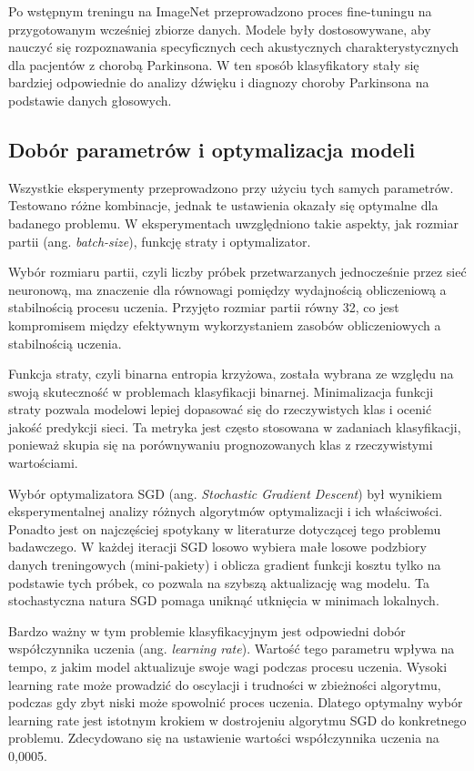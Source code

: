 Po wstępnym treningu na ImageNet przeprowadzono proces fine-tuningu na przygotowanym wcześniej zbiorze danych.
Modele były dostosowywane, aby nauczyć się rozpoznawania specyficznych cech akustycznych charakterystycznych dla pacjentów z chorobą Parkinsona.
W ten sposób klasyfikatory stały się bardziej odpowiednie do analizy dźwięku i diagnozy choroby Parkinsona na podstawie danych głosowych.

\subsection{Dobór parametrów i optymalizacja modeli}
\label{subsec:optymalizacja-modeli}

Wszystkie eksperymenty przeprowadzono przy użyciu tych samych parametrów.
Testowano różne kombinacje, jednak te ustawienia okazały się optymalne dla badanego problemu.
W eksperymentach uwzględniono takie aspekty, jak rozmiar partii (ang. \emph{batch-size}), funkcję  straty i optymalizator.

Wybór rozmiaru partii, czyli liczby próbek przetwarzanych jednocześnie przez sieć neuronową, ma znaczenie dla równowagi pomiędzy wydajnością obliczeniową a stabilnością procesu  uczenia.
Przyjęto rozmiar partii równy 32, co jest kompromisem między efektywnym wykorzystaniem zasobów obliczeniowych a stabilnością uczenia.

Funkcja straty, czyli binarna entropia krzyżowa, została wybrana ze względu na swoją skuteczność w problemach klasyfikacji binarnej.
Minimalizacja funkcji straty pozwala modelowi lepiej dopasować się do rzeczywistych klas i ocenić jakość predykcji sieci.
Ta metryka jest często stosowana w zadaniach klasyfikacji, ponieważ skupia się na porównywaniu prognozowanych klas z rzeczywistymi wartościami.

Wybór optymalizatora SGD (ang. \emph{Stochastic Gradient Descent}) był wynikiem eksperymentalnej analizy różnych algorytmów optymalizacji i ich właściwości.
Ponadto jest on najczęściej spotykany w literaturze dotyczącej tego problemu badawczego.
W każdej iteracji SGD losowo wybiera małe losowe podzbiory danych treningowych (mini-pakiety) i oblicza gradient funkcji kosztu tylko na podstawie tych próbek, co pozwala na szybszą aktualizację wag modelu.
Ta stochastyczna natura SGD pomaga uniknąć utknięcia w minimach lokalnych.

Bardzo ważny w tym problemie klasyfikacyjnym jest odpowiedni dobór współczynnika uczenia (ang. \emph{learning rate}).
Wartość tego parametru wpływa na tempo, z jakim model aktualizuje swoje wagi podczas procesu uczenia.
Wysoki learning rate może prowadzić do oscylacji i trudności w zbieżności algorytmu, podczas gdy zbyt niski może spowolnić proces uczenia.
Dlatego optymalny wybór learning rate jest istotnym krokiem w dostrojeniu algorytmu SGD do konkretnego problemu.
Zdecydowano się na ustawienie wartości współczynnika uczenia na 0,0005.

